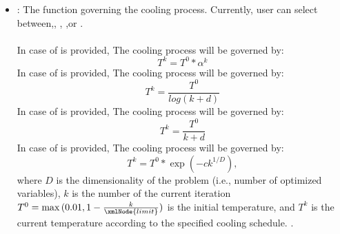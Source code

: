 \begin{itemize}
      The  node recognizes the following subnodes:
      \begin{itemize}
        \item {}: ,
          provides the desired value for the convergence criterion of the objective function
          ($\epsilon^{obj}$), i.e., convergence is reached when: $$ |newObjevtive - oldObjective|
          \le \epsilon^{obj}$$.                        , if no criteria specified

        \item {}: ,
          provides the desired value for the convergence creiteron of the system temperature,
          ($\epsilon^{temp}$), i.e., convergence is reached when: $$T \le \epsilon^{temp}$$.
          , if no criteria specified

        \item {}: ,
          provides the number of consecutive times convergence should be reached before a trajectory
          is considered fully converged. This helps in preventing early false convergence.
      \end{itemize}

    \item {}:
      The function governing the cooling process. Currently, user can select
      between,,                  ,
      ,or .\\ \\In case of  is
      provided, The cooling process will be governed by: $$ T^{k} = T^0 * \alpha^k$$
      In case of  is provided, The cooling process will be governed by: $$
      T^{k} = \frac{T^0}{log(k + d)}$$                  In case of  is provided,
      The cooling process will be governed by: $$ T^{k} = \frac{T^0}{k + d}$$In case of
       is provided, The cooling process will be governed by: $$ T^{k} =  T^0 *
      \exp(-ck^{1/D}),$$                  where $D$ is the dimensionality of the problem (i.e.,
      number of optimized variables), $k$ is the number of the current iteration
      $T^{0} = \max{(0.01,1-\frac{k}{\xmlNode{limit}})}$ is the initial temperature, and $T^{k}$ is
      the current temperature                  according to the specified cooling schedule.
      .


\end{itemize}
